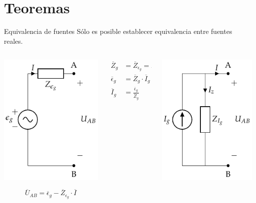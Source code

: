 \documentclass[aspectratio=169, usenames,svgnames,dvipsnames]{beamer}
\begin{document}
\section{Teoremas}
\label{sec:orgf8e3645}
\begin{frame}[label={sec:org1c871b9}]{Equivalencia de fuentes}
Sólo es posible establecer equivalencia entre \alert{fuentes reales}.
\begin{columns}
\begin{column}{0.33\columnwidth}
\begin{center}
\includegraphics[height=0.5\textheight]{../figs/FuenteTensionReal.pdf}
\end{center}
\[
  \overline{U}_{AB} = \overline{\epsilon}_g - \overline{Z}_{\epsilon_g} \cdot \overline{I}
\]
\end{column}
\begin{column}{0.33\columnwidth}
\begin{align*}
  \overline{Z}_g &= \overline{Z}_{\epsilon_g} = \overline{Z}_{I_g}\\
  \overline{\epsilon}_g &= \overline{Z}_g \cdot \overline{I}_g\\
  \overline{I}_g &= \frac{\overline{\epsilon}_g}{\overline{Z}_g}
\end{align*}
\end{column}
\begin{column}{0.33\columnwidth}
\begin{center}
\includegraphics[height=0.5\textheight]{../figs/FuenteCorrienteReal.pdf}

\end{center}
\end{column}
\end{columns}
\end{frame}
\end{document}
